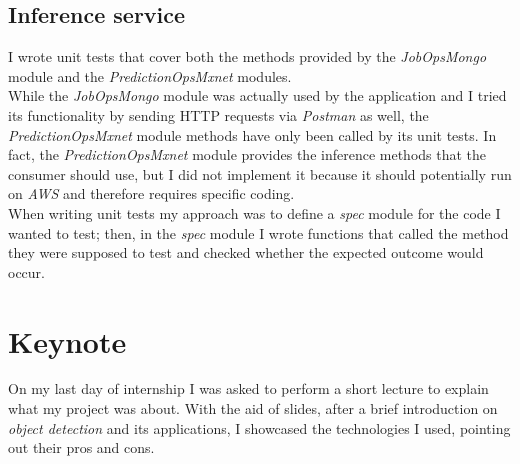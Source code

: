 \subsection{Inference service}
I wrote unit tests that cover both the methods provided by the \emph{JobOpsMongo} module and the \emph{PredictionOpsMxnet} modules. \\
While the \emph{JobOpsMongo} module was actually used by the application and I tried its functionality by sending HTTP requests via \emph{Postman} as well, the \emph{PredictionOpsMxnet} module methods have only been called by its unit tests. In fact, the \emph{PredictionOpsMxnet} module provides the inference methods that the consumer should use, but I did not implement it because it should potentially run on \emph{AWS} and therefore requires specific coding. \\
When writing unit tests my approach was to define a \emph{spec} module for the code I wanted to test; then, in the \emph{spec} module I wrote functions that called the method they were supposed to test and checked whether the expected outcome would occur.

\section{Keynote}
On my last day of internship I was asked to perform a short lecture to explain what my project was about. With the aid of slides, after a brief introduction on \emph{object detection} and its applications, I showcased the technologies I used, pointing out their pros and cons. \\
